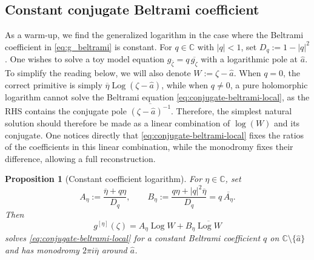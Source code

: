\documentclass[reqno]{amsart}
\numberwithin{equation}{section}
\newtheorem{prop}[theo]{Proposition}
\theoremstyle{definition}
\theoremstyle{remark}
\newcommand\C{\mathbb{C}}
\providecommand{\Log}{\operatorname{Log}}
\providecommand{\hata}{\widehat a}
\begin{document}
\subsection{Constant conjugate Beltrami coefficient}
As a warm-up, we find the generalized logarithm in the case where the Beltrami coefficient in \eqref{eq:g_beltrami} is constant. For $q\in\C$ with $|q|<1$, set $D_q:=1-|q|^2$. One wishes to solve a toy model equation $g_{\bar\zeta}=q\,\overline{g_\zeta}$ with a logarithmic pole at $\hat{a}$. To simplify the reading below, we will also denote $W:=\zeta-\hata$. When $q=0$, the correct primitive is simply $\overline\eta\Log(\zeta-\hata)$, while when $q\neq 0$, a pure holomorphic logarithm cannot solve the Beltrami equation \eqref{eq:conjugate-beltrami-local}, as the RHS contains the conjugate pole $\overline{(\zeta-\hata)^{-1}}$. Therefore, the simplest natural solution should therefore be made as a linear combination of $\log(W)$ and its conjugate. One notices directly that \eqref{eq:conjugate-beltrami-local} fixes the ratios of the coefficients in this linear combination, while the monodromy fixes their difference, allowing a full reconstruction.

\begin{prop}[Constant coefficient logarithm]\label{lem:constant-logarithm}
For $\eta\in\C$, set
\begin{equation}\label{eq:constant-Aeta-Beta}
        A_\eta:=\frac{\overline\eta+q\eta}{D_q},
        \qquad
        B_\eta:=\frac{q\eta+|q|^2\overline\eta}{D_q}
        =q\,\overline{A_\eta}.
\end{equation}
Then
\begin{equation}\label{eq:constant-g-eta}
        g^{[\eta]}(\zeta)
        =A_\eta\Log W+B_\eta\overline{\Log W}
\end{equation}
solves \eqref{eq:conjugate-beltrami-local} for a constant Beltrami coefficient $q$ on $\C\setminus\{\hata\}$ and has monodromy $2\pi i\overline\eta$ around $\hata$.
\end{prop}
\end{document}
